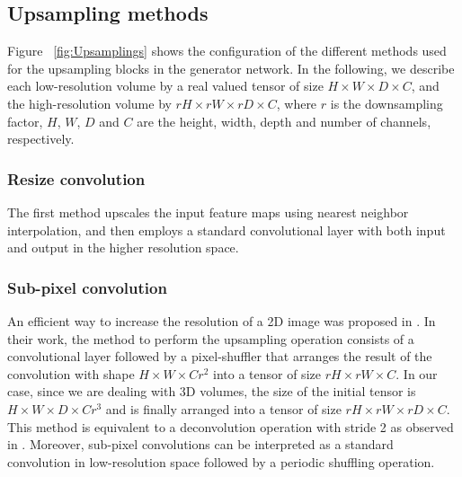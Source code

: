 \documentclass{article}
\begin{document}
\subsection{Upsampling methods}
\label{ssec:upsampling}
Figure ~\ref{fig:Upsamplings} shows the configuration of the different methods used for the upsampling blocks in the generator network. In the following, we describe each low-resolution volume by a real valued tensor of size $H \times W \times D \times C$, and the high-resolution volume by $rH \times rW \times rD \times C$, where $r$ is the downsampling factor, $H$, $W$, $D$ and $C$ are the height, width, depth and number of channels, respectively.

\subsubsection{Resize convolution}
\label{sssec:nn}
The first method upscales the input feature maps using nearest neighbor interpolation, and then employs a standard convolutional layer with both input and output in the higher resolution space.



\subsubsection{Sub-pixel convolution}
\label{sssec:subpixel}
An efficient way to increase the resolution of a 2D image was proposed in \cite{shi:efficsubpixel}. In their work, the method to perform the upsampling operation consists of a convolutional layer followed by a pixel-shuffler that arranges the result of the convolution with shape $ H \times W \times Cr^{2} $ into a tensor of size $ rH \times rW \times C $. In our case, since we are dealing with 3D volumes, the size of the initial tensor is $ H \times W \times D \times Cr^{3} $ and is finally arranged into a tensor of size $ rH \times rW \times rD \times C $. This method is equivalent to a deconvolution operation with stride 2 as observed in \cite{shi:deconvsubpix}. Moreover, sub-pixel convolutions can be interpreted as a standard convolution in low-resolution space followed by a periodic shuffling operation.
\end{document}
